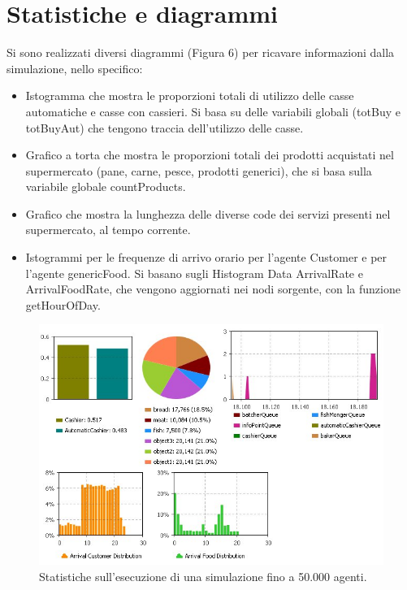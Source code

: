 \documentclass{article}
\begin{document}
\section{Statistiche e diagrammi}
Si sono realizzati diversi diagrammi (Figura 6) per ricavare informazioni dalla simulazione, nello specifico:
\begin{itemize}
\item Istogramma che mostra le proporzioni totali di utilizzo delle casse automatiche e casse con cassieri. Si basa su delle variabili globali (\textsf{totBuy} e \textsf{totBuyAut}) che tengono traccia dell'utilizzo delle casse.
\item Grafico a torta che mostra le proporzioni totali dei prodotti acquistati nel supermercato (pane, carne, pesce, prodotti generici), che si basa sulla variabile globale \textsf{countProducts}.
\item Grafico che mostra la lunghezza delle diverse code dei servizi presenti nel supermercato, al tempo corrente.
\item Istogrammi per le frequenze di arrivo orario per l'agente Customer e per l'agente genericFood. Si basano sugli Histogram Data \textsf{ArrivalRate} e \textsf{ArrivalFoodRate}, che vengono aggiornati nei nodi sorgente, con la funzione \textsf{getHourOfDay}.
\end{itemize}
\begin{center}
\begin{figure}[h]
\center
\label{diagrams}
\includegraphics[scale=0.6]{./diagrams.jpeg}
\caption{\footnotesize{Statistiche sull'esecuzione di una simulazione fino a 50.000 agenti.}}
\end{figure}
\end{center}
\end{document}
